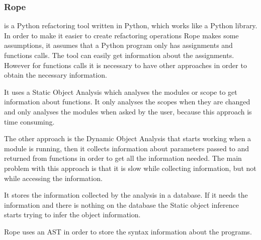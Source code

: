
\subsubsection{Rope}

 is a Python refactoring tool written in Python, which works like a Python library.
In order to make it easier to create refactoring operations Rope makes some assumptions, it assumes that a Python program only has assignments and functions calls. %
The tool can easily get information about the assignments. However for functions calls it is necessary to have other approaches in order to obtain the necessary information. 

It uses a Static Object Analysis which analyses the modules or scope to get information about functions. It only analyses the scopes when they are changed and only analyses the modules when asked by the user, because this approach is time consuming. 

The other approach is the Dynamic Object Analysis that starts working when a module is running, then it collects information about parameters passed to and returned from functions in order to get all the information needed. The main problem with this approach is that it is slow while collecting information, but not while accessing the information.

It stores the information collected by the analysis in a database. If it needs the information and there is nothing on the database the Static object inference starts trying to infer the object information.

Rope uses an AST in order to store the syntax information about the programs.






